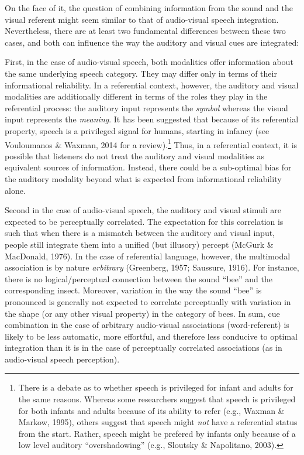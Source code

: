 \documentclass[english,floatsintext,man]{apa6}
\theoremstyle{definition}
\theoremstyle{definition}
\theoremstyle{definition}
\theoremstyle{remark}
\begin{document}
On the face of it, the question of combining information from the sound
and the visual referent might seem similar to that of audio-visual
speech integration. Nevertheless, there are at least two fundamental
differences between these two cases, and both can influence the way the
auditory and visual cues are integrated:

\noindent First, in the case of audio-visual speech, both modalities
offer information about the same underlying speech category. They may
differ only in terms of their informational reliability. In a
referential context, however, the auditory and visual modalities are
additionally different in terms of the roles they play in the
referential process: the auditory input represents the \emph{symbol}
whereas the visual input represents the \emph{meaning}. It has been
suggested that because of its referential property, speech is a
privileged signal for humans, starting in infancy (see Vouloumanos \&
Waxman, 2014 for a review).\footnote{There is a debate as to whether
  speech is privileged for infant and adults for the same reasons.
  Whereas some researchers suggest that speech is privileged for both
  infants and adults because of its ability to refer (e.g., Waxman \&
  Markow, 1995), others suggest that speech might \emph{not} have a
  referential status from the start. Rather, speech might be prefered by
  infants only because of a low level auditory ``overshadowing'' (e.g.,
  Sloutsky \& Napolitano, 2003).} Thus, in a referential context, it is
possible that listeners do not treat the auditory and visual modalities
as equivalent sources of information. Instead, there could be a
sub-optimal bias for the auditory modality beyond what is expected from
informational reliability alone.

\noindent Second in the case of audio-visual speech, the auditory and
visual stimuli are expected to be perceptually correlated. The
expectation for this correlation is such that when there is a mismatch
between the auditory and visual input, people still integrate them into
a unified (but illusory) percept (McGurk \& MacDonald, 1976). In the
case of referential language, however, the multimodal association is by
nature \emph{arbitrary} (Greenberg, 1957; Saussure, 1916). For instance,
there is no logical/perceptual connection between the sound
\enquote{bee} and the corresponding insect. Moreover, variation in the
way the sound \enquote{bee} is pronounced is generally not expected to
correlate perceptually with variation in the shape (or any other visual
property) in the category of bees. In sum, cue combination in the case
of arbitrary audio-visual associations (word-referent) is likely to be
less automatic, more effortful, and therefore less conducive to optimal
integration than it is in the case of perceptually correlated
associations (as in audio-visual speech perception).
\end{document}
